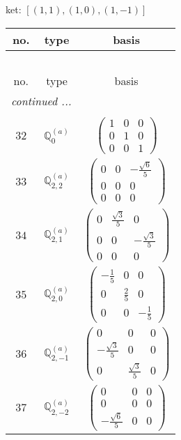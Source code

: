 \documentclass[fleqn,8pt,landscape]{jsarticle}
\begin{document}
\noindent
ket: $[(1,1),(1,0),(1,-1)]$
\begin{center}
\renewcommand{\arraystretch}{1.6}
\begin{longtable}{ccc}
 \hline \hline
no. & type & basis \\ \hline \endfirsthead

\multicolumn{2}{l}{\tablename\ \thetable{}} \\
 \hline \hline
no. & type & basis \\ \hline \endhead

 \hline \hline
\multicolumn{2}{r}{\footnotesize\it continued ...} \\ \endfoot

 \hline \hline
\multicolumn{2}{r}{} \\ \endlastfoot

$ 32 $ & $ \mathbb{Q}_{0}^{(a)} $ & $ \begin{pmatrix} 1 & 0 & 0 \\ 0 & 1 & 0 \\ 0 & 0 & 1 \end{pmatrix} $ \\ \hline
$ 33 $ & $ \mathbb{Q}_{2,2}^{(a)} $ & $ \begin{pmatrix} 0 & 0 & - \frac{\sqrt{6}}{5} \\ 0 & 0 & 0 \\ 0 & 0 & 0 \end{pmatrix} $ \\ \hline
$ 34 $ & $ \mathbb{Q}_{2,1}^{(a)} $ & $ \begin{pmatrix} 0 & \frac{\sqrt{3}}{5} & 0 \\ 0 & 0 & - \frac{\sqrt{3}}{5} \\ 0 & 0 & 0 \end{pmatrix} $ \\ \hline
$ 35 $ & $ \mathbb{Q}_{2,0}^{(a)} $ & $ \begin{pmatrix} - \frac{1}{5} & 0 & 0 \\ 0 & \frac{2}{5} & 0 \\ 0 & 0 & - \frac{1}{5} \end{pmatrix} $ \\ \hline
$ 36 $ & $ \mathbb{Q}_{2,-1}^{(a)} $ & $ \begin{pmatrix} 0 & 0 & 0 \\ - \frac{\sqrt{3}}{5} & 0 & 0 \\ 0 & \frac{\sqrt{3}}{5} & 0 \end{pmatrix} $ \\ \hline
$ 37 $ & $ \mathbb{Q}_{2,-2}^{(a)} $ & $ \begin{pmatrix} 0 & 0 & 0 \\ 0 & 0 & 0 \\ - \frac{\sqrt{6}}{5} & 0 & 0 \end{pmatrix} $ \\ \hline

\end{longtable}
\end{center}
\end{document}
